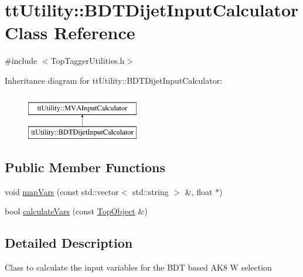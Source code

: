 \hypertarget{classttUtility_1_1BDTDijetInputCalculator}{\section{tt\-Utility\-:\-:B\-D\-T\-Dijet\-Input\-Calculator Class Reference}
\label{classttUtility_1_1BDTDijetInputCalculator}
}


{\ttfamily \#include $<$Top\-Tagger\-Utilities.\-h$>$}

Inheritance diagram for tt\-Utility\-:\-:B\-D\-T\-Dijet\-Input\-Calculator\-:\begin{figure}[H]
\begin{center}
\leavevmode
\includegraphics[height=2.000000cm]{classttUtility_1_1BDTDijetInputCalculator}
\end{center}
\end{figure}
\subsection*{Public Member Functions}
\begin{DoxyCompactItemize}
\item 
void \hyperlink{classttUtility_1_1BDTDijetInputCalculator_a918f73990d9b0528abca108f1617474b}{map\-Vars} (const std\-::vector$<$ std\-::string $>$ \&, float $\ast$)
\item 
bool \hyperlink{classttUtility_1_1BDTDijetInputCalculator_a02307c325d6cdf2d158da6ce930189c9}{calculate\-Vars} (const \hyperlink{classTopObject}{Top\-Object} \&)
\end{DoxyCompactItemize}


\subsection{Detailed Description}
Class to calculate the input variables for the B\-D\-T based A\-K8 W selection 


